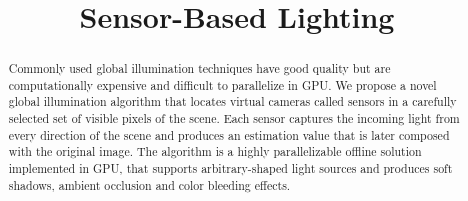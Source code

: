 \documentclass[10pt, conference]{IEEEtran}
\begin{document}
%
\title{Sensor-Based Lighting}

\newif\iffinal
\finaltrue
\newcommand{\jemsid}{99999}


\iffinal
  \author{%
  
  }
\else
  \author{Sibgrapi paper ID: \jemsid \\ }
\fi







\maketitle


\begin{abstract}
Commonly used global illumination techniques have good quality but are computationally expensive and difficult to parallelize in GPU.
We propose a novel global illumination algorithm that locates virtual cameras called sensors in a carefully selected set of visible pixels of the scene. 
Each sensor captures the incoming light from every direction of the scene and produces an estimation value that is later composed with the original image. 
The algorithm is a highly parallelizable offline solution implemented in GPU, that supports arbitrary-shaped light sources and produces soft shadows, ambient occlusion and color bleeding effects.


%
\end{abstract}
\end{document}
